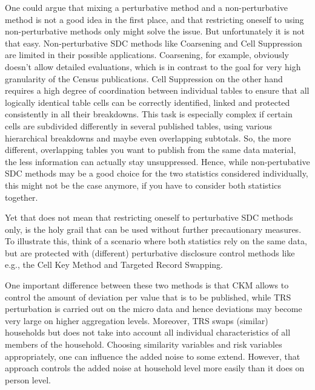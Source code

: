 One could argue that mixing a perturbative method and a non-perturbative method is not a good idea in the first place, and that restricting oneself to using non-perturbative methods only might solve the issue. But unfortunately it is not that easy. Non-perturbative SDC methods like Coarsening and Cell Suppression are limited in their possible applications. Coarsening, for example, obviously doesn't allow detailed evaluations, which is in contrast to the goal for very high granularity of the Census publications. Cell Suppression on the other hand requires a high degree of coordination between individual tables to ensure that all logically identical table cells can be correctly identified, linked and protected consistently in all their breakdowns. This task is especially complex if certain cells are subdivided differently in several published tables, using various hierarchical breakdowns and maybe even overlapping subtotals. So, the more different, overlapping tables you want to publish from the same data material, the less information can actually stay unsuppressed. Hence, while non-pertubative SDC methods may be a good choice for the two statistics considered individually, this might not be the case anymore, if you have to consider both statistics together.

Yet that does not mean that restricting oneself to perturbative SDC methods only, is the holy grail that can be used without further precautionary measures. To illustrate this, think of a scenario where both statistics rely on the same data, but are protected with (different) perturbative disclosure control methods like e.g., the Cell Key Method and Targeted Record Swapping. 

One important difference between these two methods is that CKM allows to control the amount of deviation per value that is to be published, while TRS perturbation is carried out on the micro data and hence deviations may become very large on higher aggregation levels. Moreover, TRS swaps (similar) households but does not take into account all individual characteristics of all members of the household. Choosing similarity variables and risk variables appropriately, one can influence the added noise to some extend. However, that approach controls the added noise at household level more easily than it does on person level.

